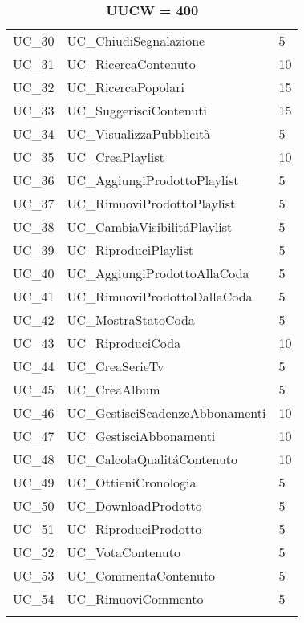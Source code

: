 \begin{longtable}{| p{} | p{} | p{} |}
UC\_30 & UC\_ChiudiSegnalazione & 5\\
UC\_31 & UC\_RicercaContenuto & 10\\
UC\_32 & UC\_RicercaPopolari & 15\\
UC\_33 & UC\_SuggerisciContenuti & 15\\
UC\_34 & UC\_VisualizzaPubblicità & 5\\
UC\_35 & UC\_CreaPlaylist & 10\\
UC\_36 & UC\_AggiungiProdottoPlaylist & 5\\
UC\_37 & UC\_RimuoviProdottoPlaylist & 5\\
UC\_38 & UC\_CambiaVisibilitáPlaylist & 5\\
UC\_39 & UC\_RiproduciPlaylist & 5\\
UC\_40 & UC\_AggiungiProdottoAllaCoda & 5\\
UC\_41 & UC\_RimuoviProdottoDallaCoda & 5\\
UC\_42 & UC\_MostraStatoCoda & 5\\
UC\_43 & UC\_RiproduciCoda & 10\\
UC\_44 & UC\_CreaSerieTv & 5\\
UC\_45 & UC\_CreaAlbum & 5\\
UC\_46 & UC\_GestisciScadenzeAbbonamenti & 10\\
UC\_47 & UC\_GestisciAbbonamenti & 10\\
UC\_48 & UC\_CalcolaQualitáContenuto & 10\\
UC\_49 & UC\_OttieniCronologia & 5\\
UC\_50 & UC\_DownloadProdotto & 5\\
UC\_51 & UC\_RiproduciProdotto & 5\\
UC\_52 & UC\_VotaContenuto & 5\\
UC\_53 & UC\_CommentaContenuto & 5\\
UC\_54 & UC\_RimuoviCommento & 5\\\hline
\caption*{\textbf{UUCW = 400}}
\end{longtable}

